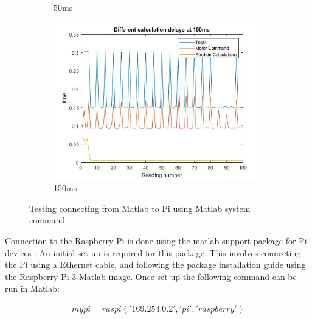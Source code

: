 \documentclass[twoside,twocolumn,12pt]{article}
\begin{document}
\begin{figure}[t]
\begin{subfigure}[t]{0.325\textwidth}
    \caption{50ms}
  \label{fig:pi50}
  \end{subfigure}
  \begin{subfigure}[t]{0.325\textwidth}
    \includegraphics[width=\linewidth]{150ms_pi}
    \caption{150ms}
  \label{fig:pi150}
  \end{subfigure}
  \caption{Testing connecting from Matlab to Pi using Matlab system command}
  \label{fig:pi}
\end{figure}
Connection to the Raspberry Pi is done using the matlab support package for Pi devices \cite{pi}. An initial set-up is required for this package. This involves connecting the Pi using a Ethernet cable, and following the package installation guide using the Raspberry Pi 3 Matlab image. Once set up the following command can be run in Matlab:

\begin{gather}
mypi = raspi('169.254.0.2', 'pi', 'raspberry') 
\end{gather}
\end{document}
